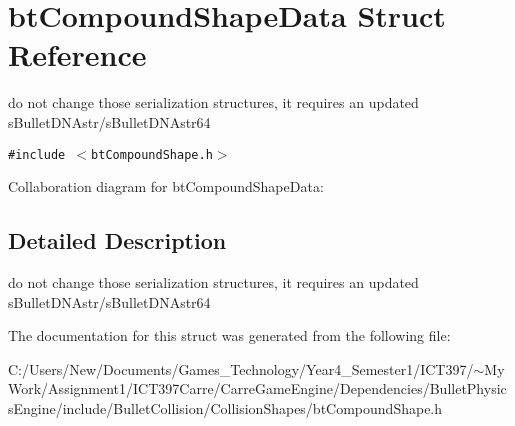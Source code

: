 \hypertarget{structbt_compound_shape_data}{
\section{btCompoundShapeData Struct Reference}
\label{structbt_compound_shape_data}
}
do not change those serialization structures, it requires an updated sBulletDNAstr/sBulletDNAstr64  


{\tt \#include $<$btCompoundShape.h$>$}

Collaboration diagram for btCompoundShapeData:

\subsection{Detailed Description}
do not change those serialization structures, it requires an updated sBulletDNAstr/sBulletDNAstr64 

The documentation for this struct was generated from the following file:\begin{CompactItemize}
\item 
C:/Users/New/Documents/Games\_\-Technology/Year4\_\-Semester1/ICT397/$\sim$My Work/Assignment1/ICT397Carre/CarreGameEngine/Dependencies/BulletPhysicsEngine/include/BulletCollision/CollisionShapes/btCompoundShape.h\end{CompactItemize}
